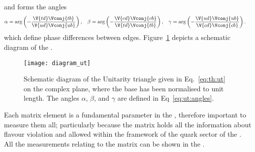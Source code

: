 and forms the angles
\begin{align}
  \alpha &= \arg\left(-\frac{\V{td}\Vconj{tb}}{\V{ud}\Vconj{ub}}\right), &
  \beta  &= \arg\left(-\frac{\V{cd}\Vconj{cb}}{\V{td}\Vconj{tb}}\right), &
  \gamma &= \arg\left(-\frac{\V{ud}\Vconj{ub}}{\V{cd}\Vconj{cb}}\right).
  \label{eq:ut:angles}
\end{align}
which define phase differences between edges.
Figure~\ref{fig:th:ut} depicts a schematic diagram of the \ut.

\begin{figure}
  \begin{center}
      \texttt{[image: diagram\_ut]}
  \end{center}
  \caption[Schematic diagram of the Unitarity Triangle]
  {
    Schematic diagram of the Unitarity triangle given in Eq.~\protect\ref{eq:th:ut} on the complex
    plane, where the base has been normalised to unit length.
    The angles $\alpha$, $\beta$, and $\gamma$ are defined in Eq~\protect\ref{eq:ut:angles}.
  }
  \label{fig:th:ut}
\end{figure}


Each \ckm matrix element is a fundamental parameter in the \sm,  therefore important to
measure them all; particularly because the \ckm matrix holds all
the information about flavour violation and \CPV {} allowed within the
framework of the quark sector of the \sm.
All the measurements relating to the \ckm matrix can be shown in the \ut.







